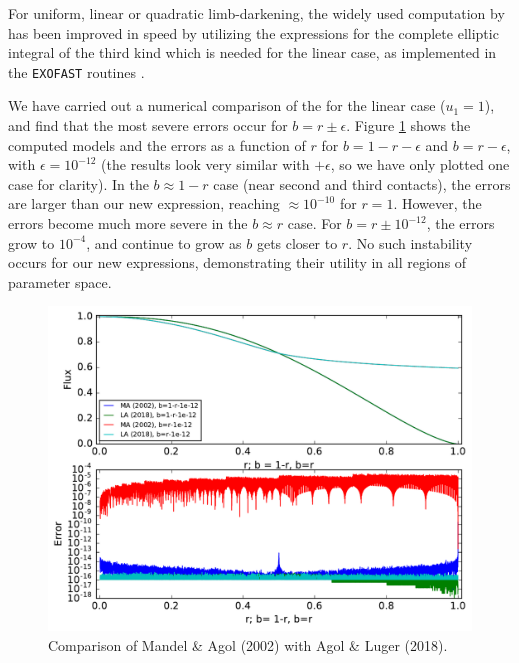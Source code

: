 \documentclass[modern]{aastex61}
\begin{document}
For uniform, linear or quadratic limb-darkening, the widely used computation 
by \citet{MandelAgol2002} has been improved in speed by utilizing the 
\citet{Bulirsch1965a,Bulirsch1965b} expressions for the complete elliptic 
integral of the third kind which is needed for the linear case, as implemented 
in the \texttt{EXOFAST} routines \citep{Eastman2013}.

We have carried out a numerical comparison of the \citet{MandelAgol2002}
for the linear case ($u_1=1$), and find that the most severe errors
occur for $b = r \pm \epsilon$.  Figure \ref{fig:compareMA} shows
the computed models and the errors as a function of $r$ for $b=1-r-\epsilon$
and $b=r-\epsilon$, with $\epsilon = 10^{-12}$ (the results look very
similar with $+\epsilon$, so we have only plotted one case for clarity).
In the $b\approx 1-r$ case (near second and third contacts), the errors
are larger than our new expression, reaching $\approx 10^{-10}$ for
$r = 1$.  However, the errors become much more severe in the $b \approx r$
case.  For $b=r \pm 10^{-12}$, the errors grow to $10^{-4}$, and continue
to grow as $b$ gets closer to $r$.  No such instability occurs for
our new expressions, demonstrating their utility in all regions of
parameter space.

\begin{figure}
    \begin{centering}
    \includegraphics[width=\linewidth]{figures/julia/compare_MA2002_linear.pdf}
    \caption{Comparison of Mandel \& Agol (2002) with Agol \& Luger (2018).}
    \label{fig:compareMA}
    \end{centering} 
\end{figure}
\end{document}
